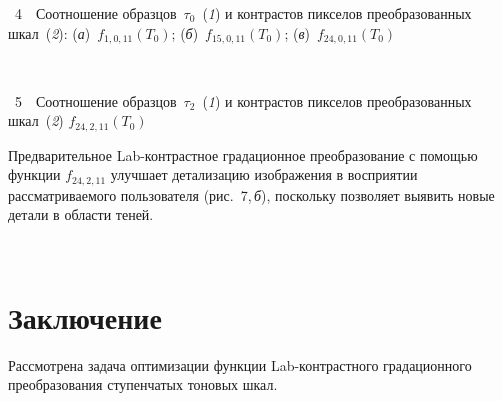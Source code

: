 \begin{multicols}{2}
  \vspace*{-9pt}

\noindent
{{\figurename~4}\ \ \small{Соотношение образцов~$\tau_0$~(\textit{1}) 
и контрастов пикселов преобразованных шкал~(\textit{2}): 
(\textit{а})~$f_{1,0,11}(T_0)$; (\textit{б})~$f_{15,0,11}(T_0)$;
(\textit{в})~$f_{24,0,11}(T_0)$}}

\vspace*{3pt}





\begin{center}  %
\vspace*{-2pt}
\mbox{%
 \epsfxsize=43.389mm
 }
  \end{center}

  \vspace*{-3pt}

\noindent
{{\figurename~5}\ \ \small{Соотношение образцов~$\tau_2$~(\textit{1}) и контрастов пикселов преобразованных 
шкал~(\textit{2}) $f_{24,2,11}(T_0)$}}

\vspace*{12pt}

\addtocounter{figure}{1}

  
  


  
  Предварительное Lab-конт\-раст\-ное градационное преобразование с 
помощью функции $f_{24,2,11}$ улучшает детализацию изображения в 
восприятии рассматриваемого пользователя (рис.~7,\,\textit{б}), поскольку 
позволяет выявить новые детали в области теней.


\setcounter{figure}{6}
\begin{figure*} %
\vspace*{1pt}
 \begin{center}
 \mbox{%
 \epsfxsize=140.864mm
 }
 \end{center}
 \vspace*{-6pt}
\end{figure*}
  
\section{Заключение}
  
  Рассмотрена задача оптимизации функции Lab-конт\-раст\-но\-го 
градационного преобразования ступенчатых тоновых шкал. 
  

\end{multicols}
